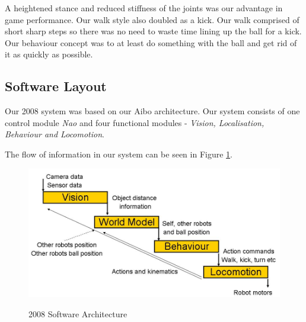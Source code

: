 A heightened stance and reduced stiffness of the joints was our advantage in game performance. Our walk style also doubled as a kick. Our walk comprised of short sharp steps so there was no need to waste time lining up the ball for a kick. Our behaviour concept was to at least do something with the ball and get rid of it as quickly as possible. 


\subsection{Software Layout}

Our 2008 system was based on our Aibo architecture. Our system consists of one control module \emph{Nao} and four functional modules -
\emph{Vision, Localisation, Behaviour and
Locomotion}. 

The flow of information in our system can be seen in Figure
\ref{fig:software}. 

\begin{figure}[!h]
\begin{center}
    \scalebox{0.5} {\includegraphics{figs/software.jpg} }
    \caption{2008 Software Architecture}
    \label{fig:software}
\end{center}
\end{figure}


